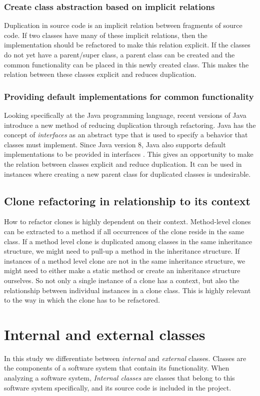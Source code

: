 \subsubsection{Create class abstraction based on implicit relations}
Duplication in source code is an implicit relation between fragments of source code. If two classes have many of these implicit relations, then the implementation should be refactored to make this relation explicit. If the classes do not yet have a parent/super class, a parent class can be created and the common functionality can be placed in this newly created class. This makes the relation between these classes explicit and reduces duplication.

\subsubsection{Providing default implementations for common functionality}
Looking specifically at the Java programming language, recent versions of Java introduce a new method of reducing duplication through refactoring. Java has the concept of \textit{interfaces} as an abstract type that is used to specify a behavior that classes must implement. Since Java version 8, Java also supports default implementations to be provided in interfaces \cite{mohnen2002interfaces}. This gives an opportunity to make the relation between classes explicit and reduce duplication. It can be used in instances where creating a new parent class for duplicated classes is undesirable.

\subsection{Clone refactoring in relationship to its context}
How to refactor clones is highly dependent on their context. Method-level clones can be extracted to a method \cite{kodhai2013method} if all occurrences of the clone reside in the same class. If a method level clone is duplicated among classes in the same inheritance structure, we might need to pull-up a method in the inheritance structure. If instances of a method level clone are not in the same inheritance structure, we might need to either make a static method or create an inheritance structure ourselves. So not only a single instance of a clone has a context, but also the relationship between individual instances in a clone class. This is highly relevant to the way in which the clone has to be refactored.

\section{Internal and external classes}
In this study we differentiate between \textit{internal} and \textit{external} classes. Classes are the components of a software system that contain its functionality. When analyzing a software system, \textit{Internal classes} are classes that belong to this software system specifically, and its source code is included in the project.

